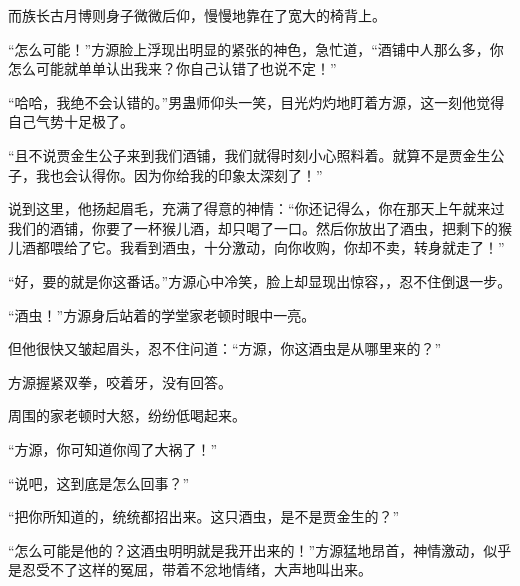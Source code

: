 \begin{this_body}
而族长古月博则身子微微后仰，慢慢地靠在了宽大的椅背上。

“怎么可能！”方源脸上浮现出明显的紧张的神色，急忙道，“酒铺中人那么多，你怎么可能就单单认出我来？你自己认错了也说不定！”

“哈哈，我绝不会认错的。”男蛊师仰头一笑，目光灼灼地盯着方源，这一刻他觉得自己气势十足极了。

“且不说贾金生公子来到我们酒铺，我们就得时刻小心照料着。就算不是贾金生公子，我也会认得你。因为你给我的印象太深刻了！”

说到这里，他扬起眉毛，充满了得意的神情：“你还记得么，你在那天上午就来过我们的酒铺，你要了一杯猴儿酒，却只喝了一口。然后你放出了酒虫，把剩下的猴儿酒都喂给了它。我看到酒虫，十分激动，向你收购，你却不卖，转身就走了！”

“好，要的就是你这番话。”方源心中冷笑，脸上却显现出惊容，，忍不住倒退一步。

“酒虫！”方源身后站着的学堂家老顿时眼中一亮。

但他很快又皱起眉头，忍不住问道：“方源，你这酒虫是从哪里来的？”

方源握紧双拳，咬着牙，没有回答。

周围的家老顿时大怒，纷纷低喝起来。

“方源，你可知道你闯了大祸了！”

“说吧，这到底是怎么回事？”

“把你所知道的，统统都招出来。这只酒虫，是不是贾金生的？”

“怎么可能是他的？这酒虫明明就是我开出来的！”方源猛地昂首，神情激动，似乎是忍受不了这样的冤屈，带着不忿地情绪，大声地叫出来。

\end{this_body}

